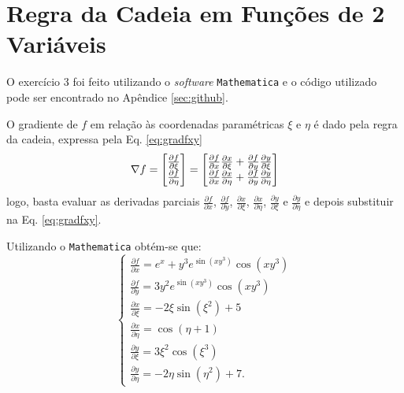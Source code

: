 \section{Regra da Cadeia em Fun\c{c}\~oes de 2 Vari\'aveis} \label{sec:ex3}
O exerc\'icio 3 foi feito utilizando o \textit{software} \texttt{Mathematica} e o c\'odigo utilizado pode ser encontrado no Ap\^endice \ref{sec:github}. 

O gradiente de $f$ em rela\c{c}\~ao \`as coordenadas param\'etricas $\xi$ e $\eta$ \'e dado pela regra da cadeia, expressa pela Eq. \eqref{eq:gradfxy}
\begin{equation}
    \label{eq:gradfxy}   
    \nabla f = \begin{bmatrix}
        \frac{\partial f}{\partial \xi} \\
        \frac{\partial f}{\partial \eta}
    \end{bmatrix} = 
    \begin{bmatrix}
        \frac{\partial f}{\partial x} \frac{\partial x}{\partial \xi} + \frac{\partial f}{\partial y} \frac{\partial y}{\partial \xi} \\
        \frac{\partial f}{\partial x} \frac{\partial x}{\partial \eta} + \frac{\partial f}{\partial y} \frac{\partial y}{\partial \eta}
    \end{bmatrix}
\end{equation}
logo, basta evaluar as derivadas parciais $\frac{\partial f}{\partial x}$, $\frac{\partial f}{\partial y}$, $\frac{\partial x}{\partial \xi}$, $\frac{\partial x}{\partial \eta}$, $\frac{\partial y}{\partial \xi}$ e $\frac{\partial y}{\partial \eta}$  e depois substituir na Eq. \eqref{eq:gradfxy}.

Utilizando o \texttt{Mathematica} obt\'em-se que: 
\begin{equation*}
    \begin{cases}
        \frac{\partial f}{\partial x} = e^x + y^3 e^{\sin \left(x
        y^3\right)} \cos \left(x
        y^3\right) \\ 
        \frac{\partial f}{\partial y} = 3 y^2 e^{\sin \left(x
        y^3\right)} \cos \left(x
        y^3\right) \\
        \frac{\partial x}{\partial \xi} = -2 \xi \sin \left(\xi^2\right) + 5 \\
        \frac{\partial x}{\partial \eta} = \cos \left(\eta + 1\right) \\
        \frac{\partial y}{\partial \xi} = 3 \xi^2 \cos \left(\xi^3\right) \\
        \frac{\partial y}{\partial \eta} = -2 \eta \sin \left(\eta^2\right) + 7.
    \end{cases}
\end{equation*}

